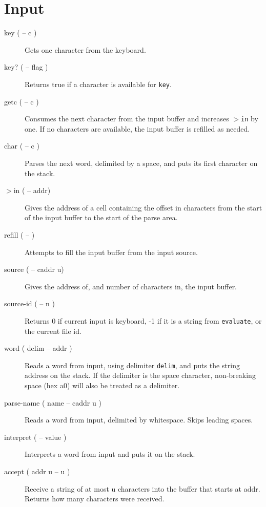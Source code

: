 \section{Input}

\begin{description}

\item[key ( -- c )] Gets one character from the keyboard.
\item[key? ( -- flag )] Returns true if a character is available for \texttt{key}.
\item[getc ( -- c )] Consumes the next character from the input buffer and increases \texttt{$>$in} by one. If no characters are available, the input buffer is refilled as needed.

\item[char ( -- c )] Parses the next word, delimited by a space, and puts its first character on the stack.

\item[$>$in ( -- addr)] Gives the address of a cell containing the offset in characters from the start of the input buffer to the start of the parse area.

\item[refill ( -- )] Attempts to fill the input buffer from the input source.

\item[source ( -- caddr u)] Gives the address of, and number of characters in, the input buffer.
\item[source-id ( -- n )] Returns 0 if current input is keyboard, -1 if it is a string from \texttt{evaluate}, or the current file id.

\item[word ( delim -- addr )] Reads a word from input, using delimiter \texttt{delim}, and puts the string address on the stack. If the delimiter is the space character, non-breaking space (hex a0) will also be treated as a delimiter.

\item[parse-name ( name -- caddr u )] Reads a word from input, delimited by whitespace. Skips leading spaces. 

\item[interpret ( -- value )] Interprets a word from input and puts it on the stack.

\item[accept ( addr u -- u )] Receive a string of at most u characters into the buffer that starts at addr. Returns how many characters were received.


\end{description}
